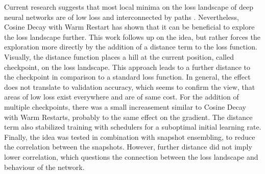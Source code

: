Current research suggests that most local minima on the loss landscape of deep
neural networks are of low loss and interconnected by paths
\cite{choromanska2015loss} \cite{draxler2018essentially} \cite{he2020piecewise}.
Nevertheless, Cosine Decay with Warm Restart \cite{loshchilov2016sgdr} has shown
that it can be beneficial to explore the loss landscape further. This work
follows up on the idea, but rather forces the exploration more directly by the
addition of a distance term to the loss function. Visually, the distance
function places a hill at the current position, called checkpoint, on the loss
landscape. This approach leads to a further distance to the checkpoint in
comparison to a standard loss function. In general, the effect does not
translate to validation accuracy, which seems to confirm the view, that areas of
low loss exist everywhere and are of same cost. For the addition of multiple
checkpoints, there was a small increasement similar to Cosine Decay with Warm
Restarts, probably to the same effect on the gradient. The distance term also
stabilized training with schedulers for a suboptimal initial learning rate.
Finally, the idea was tested in combination with snapshot ensembling, to reduce
the correlation between the snapshots. However, further distance did not imply
lower correlation, which questions the connection between the loss landscape and
behaviour of the network.